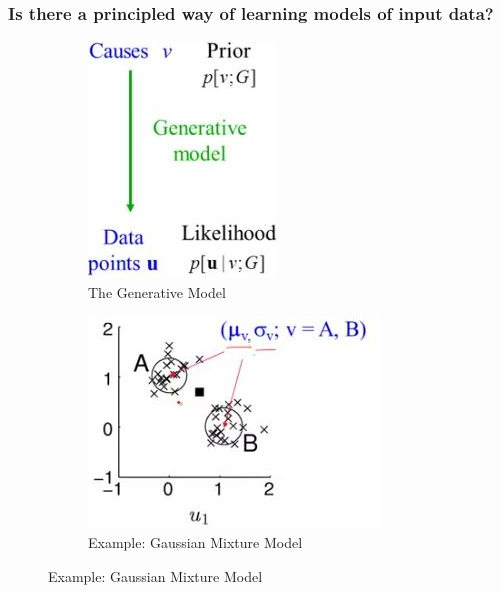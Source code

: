 \documentclass[]{article}
\begin{document}
\subsubsection{Is there a principled way of learning models of input data?}
\begin{figure}[H]
	\caption{Unsupervised Learning via a Generative Model}
	\begin{subfigure}[t]{0.4\textwidth}
		\caption{The Generative Model}
		\includegraphics[width=\textwidth]{unsupervised-learning-via-generative-model}
	\end{subfigure}
	\begin{subfigure}[t]{0.5\textwidth}
		\caption{Example: Gaussian Mixture Model}\label{fig:gmm}
		\includegraphics[width=\textwidth]{unsupervised-learning-example}
	\end{subfigure}
\end{figure}
\end{document}

